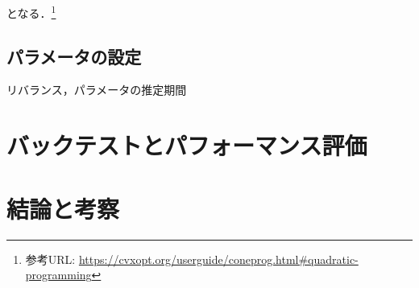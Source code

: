                                                                                                                                                                         となる．\footnote{参考URL: \url{https://cvxopt.org/userguide/coneprog.html#quadratic-programming}}

                                                                                                                                                                        \subsection{パラメータの設定}

                                                                                                                                                                        リバランス，パラメータの推定期間

                                                                                                                                                                        \section{バックテストとパフォーマンス評価}

                                                                                                                                                                        \section{結論と考察}

                                                                                                                                                                        
